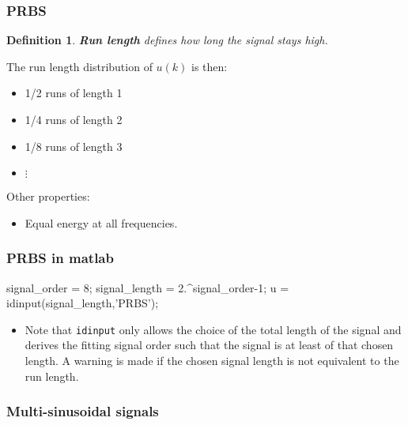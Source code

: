 \documentclass[10pt,a4paper]{scrartcl}
\newtheorem{define}{Definition}
\begin{document}
\begin{multicols*}{2}
\subsubsection{PRBS}




\begin{define}
\textbf{Run length} defines how long the signal stays high.
\end{define}

The run length distribution of $u(k)$ is then:

\begin{itemize}
\item[] 1/2 runs of length 1
\item[] 1/4 runs of length 2
\item[] 1/8 runs of length 3
\item[] $\vdots$
\end{itemize}

Other properties:

\begin{itemize}
\item Equal energy at all frequencies.
\end{itemize}

\subsubsection{PRBS in matlab}

\begin{TPMatlab}
signal_order = 8;
signal_length = 2.^signal_order-1;
u = idinput(signal_length,'PRBS');
\end{TPMatlab}

\begin{itemize}
\item Note that \verb+idinput+ only allows the choice of the total length of the signal and derives the fitting signal order such that the signal is at least of that chosen length. A warning is made if the chosen signal length is not equivalent to the run length.
\end{itemize}

\subsubsection{Multi-sinusoidal signals}


\end{multicols*}
\end{document}
